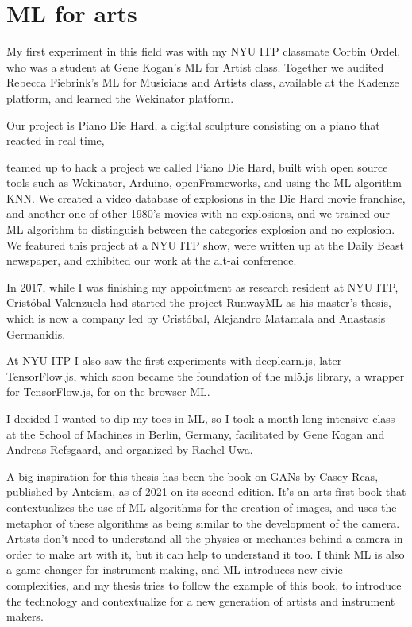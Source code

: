 \section{ML for arts}


My first experiment in this field was with my \acrshort{NYU} \acrshort{ITP} classmate Corbin Ordel, who was a student at Gene Kogan's \acrshort{ML} for Artist class. Together we audited Rebecca Fiebrink's \acrshort{ML} for Musicians and Artists class, available at the Kadenze platform, and learned the Wekinator platform.

Our project is Piano Die Hard, a digital sculpture consisting on a piano that reacted in real time, 


teamed up to hack a project we called Piano Die Hard, built with open source tools such as Wekinator, Arduino, openFrameworks, and using the \acrshort{ML} algorithm KNN. We created a video database of explosions in the Die Hard movie franchise, and another one of other 1980's movies with no explosions, and we trained our \acrshort{ML} algorithm to distinguish between the categories explosion and no explosion. We featured this project at a \acrshort{NYU} \acrshort{ITP} show, were written up at the Daily Beast newspaper, and exhibited our work at the alt-ai conference.

In 2017, while I was finishing my appointment as research resident at \acrshort{NYU} ITP, Cristóbal Valenzuela had started the project RunwayML as his master's thesis, which is now a company led by Cristóbal, Alejandro Matamala and Anastasis Germanidis.

At \acrshort{NYU} \acrshort{ITP} I also saw the first experiments with deeplearn.js, later TensorFlow.js, which soon became the foundation of the ml5.js library, a wrapper for TensorFlow.js, for on-the-browser \acrshort{ML}.

I decided I wanted to dip my toes in \acrshort{ML}, so I took a month-long intensive class at the School of Machines in Berlin, Germany, facilitated by Gene Kogan and Andreas Refsgaard, and organized by Rachel Uwa.


A big inspiration for this thesis has been the book on GANs by Casey Reas, published by Anteism, as of 2021 on its second edition. It’s an arts-first book that contextualizes the use of \acrshort{ML} algorithms for the creation of images, and uses the metaphor of these algorithms as being similar to the development of the camera. Artists don’t need to understand all the physics or mechanics behind a camera in order to make art with it, but it can help to understand it too. I think \acrshort{ML} is also a game changer for instrument making, and \acrshort{ML} introduces new civic complexities, and my thesis tries to follow the example of this book, to introduce the technology and contextualize for a new generation of artists and instrument makers.

